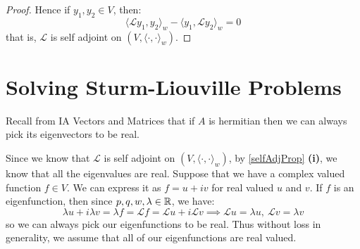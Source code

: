 \documentclass[../main.tex]{subfiles}
\begin{document}
\begin{proof}
  Hence if $y_1, y_2 \in V$, then:
  \[
    \langle \mathcal{L}y_1, y_2 \rangle_{w} - \langle y_1, \mathcal{L}y_2 \rangle_{w} = 0
  \]
  that is, $\mathcal{L}$ is self adjoint on $(V, \langle \cdot, \cdot \rangle_{w})$.
\end{proof}
\section{Solving Sturm-Liouville Problems}
\begin{remark}[Recap]
  Recall from IA Vectors and Matrices that if $A$ is hermitian then we can always pick its eigenvectors to be real.
\end{remark}
Since we know that $\mathcal{L}$ is self adjoint on $(V, \langle \cdot, \cdot \rangle_{w})$, by \cref{selfAdjProp} \textbf{(i)}, we know that all the eigenvalues are real.
Suppose that we have a complex valued function $f \in V$.
We can express it as $f = u + iv$ for real valued $u$ and $v$.
If $f$ is an eigenfunction, then since $p, q, w, \lambda \in \mathbb{R}$, we have:
\[
  \lambda u + i\lambda v = \lambda f = \mathcal{L} f = \mathcal{L} u + i\mathcal{L} v \implies \mathcal{L} u = \lambda u,\ \mathcal{L} v = \lambda v
\]
so we can always pick our eigenfunctions to be real.
Thus without loss in generality, we assume that all of our eigenfunctions are real valued.
\end{document}
